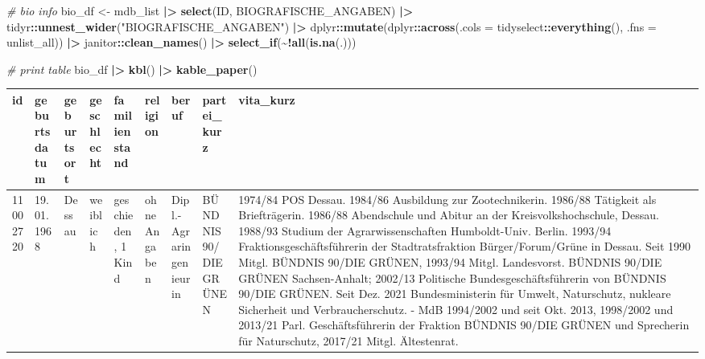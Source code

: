 \documentclass[
]{article}
\newenvironment{Shaded}{\begin{snugshade}}{\end{snugshade}}
\newcommand{\AttributeTok}[1]{\textcolor[rgb]{0.13,0.29,0.53}{#1}}
\newcommand{\CommentTok}[1]{\textcolor[rgb]{0.56,0.35,0.01}{\textit{#1}}}
\newcommand{\FunctionTok}[1]{\textcolor[rgb]{0.13,0.29,0.53}{\textbf{#1}}}
\newcommand{\NormalTok}[1]{#1}
\newcommand{\OtherTok}[1]{\textcolor[rgb]{0.56,0.35,0.01}{#1}}
\newcommand{\SpecialCharTok}[1]{\textcolor[rgb]{0.81,0.36,0.00}{\textbf{#1}}}
\newcommand{\StringTok}[1]{\textcolor[rgb]{0.31,0.60,0.02}{#1}}
\begin{document}
\begin{Shaded}
\begin{Highlighting}[]
\CommentTok{\# bio info}
\NormalTok{bio\_df }\OtherTok{\textless{}{-}}\NormalTok{ mdb\_list }\SpecialCharTok{|\textgreater{}} 
  \FunctionTok{select}\NormalTok{(ID, BIOGRAFISCHE\_ANGABEN) }\SpecialCharTok{|\textgreater{}} 
\NormalTok{  tidyr}\SpecialCharTok{::}\FunctionTok{unnest\_wider}\NormalTok{(}\StringTok{"BIOGRAFISCHE\_ANGABEN"}\NormalTok{) }\SpecialCharTok{|\textgreater{}} 
\NormalTok{  dplyr}\SpecialCharTok{::}\FunctionTok{mutate}\NormalTok{(dplyr}\SpecialCharTok{::}\FunctionTok{across}\NormalTok{(}\AttributeTok{.cols =}\NormalTok{ tidyselect}\SpecialCharTok{::}\FunctionTok{everything}\NormalTok{(),}
                              \AttributeTok{.fns =}\NormalTok{ unlist\_all)) }\SpecialCharTok{|\textgreater{}} 
\NormalTok{  janitor}\SpecialCharTok{::}\FunctionTok{clean\_names}\NormalTok{() }\SpecialCharTok{|\textgreater{}} 
  \FunctionTok{select\_if}\NormalTok{(}\SpecialCharTok{\textasciitilde{}!}\FunctionTok{all}\NormalTok{(}\FunctionTok{is.na}\NormalTok{(.)))}

\CommentTok{\# print table}
\NormalTok{bio\_df }\SpecialCharTok{|\textgreater{}} 
  \FunctionTok{kbl}\NormalTok{() }\SpecialCharTok{|\textgreater{}} 
  \FunctionTok{kable\_paper}\NormalTok{()}
\end{Highlighting}
\end{Shaded}

\begin{table}
\centering
\begin{tabular}[t]{l|l|l|l|l|l|l|l|l}
\hline
id & geburtsdatum & geburtsort & geschlecht & familienstand & religion & beruf & partei\_kurz & vita\_kurz\\
\hline
11002720 & 19.01.1968 & Dessau & weiblich & geschieden, 1 Kind & ohne Angaben & Dipl.-Agraringenieurin & BÜNDNIS 90/DIE GRÜNEN & 1974/84 POS Dessau. 1984/86 Ausbildung zur Zootechnikerin. 1986/88 Tätigkeit als Briefträgerin. 1986/88 Abendschule und Abitur an der Kreisvolkshochschule, Dessau. 1988/93 Studium der Agrarwissenschaften Humboldt-Univ. Berlin. 1993/94 Fraktionsgeschäftsführerin der Stadtratsfraktion Bürger/Forum/Grüne in Dessau. Seit 1990 Mitgl. BÜNDNIS 90/DIE GRÜNEN, 1993/94 Mitgl. Landesvorst. BÜNDNIS 90/DIE GRÜNEN Sachsen-Anhalt; 2002/13 Politische Bundesgeschäftsführerin von BÜNDNIS 90/DIE GRÜNEN. Seit Dez. 2021 Bundesministerin für Umwelt, Naturschutz, nukleare Sicherheit und Verbraucherschutz. - MdB 1994/2002 und seit Okt. 2013, 1998/2002 und 2013/21 Parl. Geschäftsführerin der Fraktion BÜNDNIS 90/DIE GRÜNEN und Sprecherin für Naturschutz, 2017/21 Mitgl. Ältestenrat.\\
\hline
\end{tabular}
\end{table}
\end{document}
